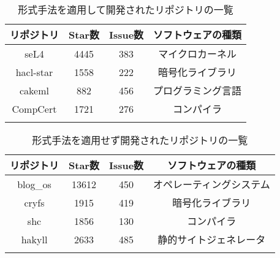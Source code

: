 
\begin{table}[p]
	\centering
	\caption{形式手法を適用して開発されたリポジトリの一覧}
	\label{tab:repository_formal}
	\begin{tabular}{cccc} %
		\Hline
		リポジトリ & Star数 & Issue数 & ソフトウェアの種類   \\\hline
		seL4       & 4445   & 383     & マイクロカーネル   \\
		hacl-star  & 1558   & 222     & 暗号化ライブラリ   \\
		cakeml     & 882    & 456     & プログラミング言語 \\
		CompCert   & 1721   & 276     & コンパイラ         \\\Hline
	\end{tabular}
\end{table}

\begin{table}[p]
	\centering
	\caption{形式手法を適用せず開発されたリポジトリの一覧}
	\label{tab:repository_common}
	\begin{tabular}{cccc} %
		\Hline
		リポジトリ & Star数 & Issue数 & ソフトウェアの種類         \\\hline
		blog\_os   & 13612  & 450     & オペレーティングシステム \\
		cryfs      & 1915   & 419     & 暗号化ライブラリ         \\
		shc        & 1856   & 130     & コンパイラ               \\
		hakyll     & 2633   & 485     & 静的サイトジェネレータ   \\\Hline
	\end{tabular}
\end{table}



